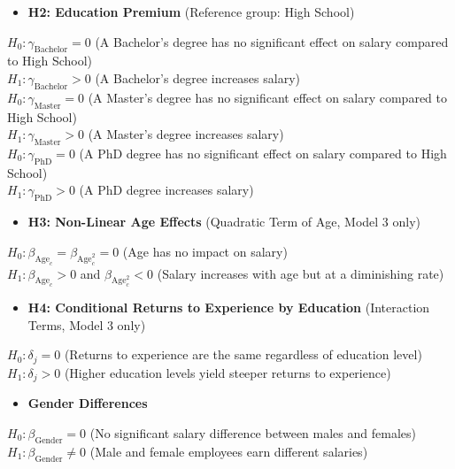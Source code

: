 \documentclass[12pt, a4paper]{article}
\begin{document}
\begin{itemize}[leftmargin=1.5em]
  \item \textbf{H2: Education Premium} (Reference group: High School)
\end{itemize}
$H_0: \gamma_{\text{Bachelor}} = 0$ (A Bachelor's degree has no significant effect on salary compared to High School)\\
$H_1: \gamma_{\text{Bachelor}} > 0$ (A Bachelor's degree increases salary)\\[0.5em]
$H_0: \gamma_{\text{Master}} = 0$ (A Master's degree has no significant effect on salary compared to High School)\\
$H_1: \gamma_{\text{Master}} > 0$ (A Master's degree increases salary)\\[0.5em]
$H_0: \gamma_{\text{PhD}} = 0$ (A PhD degree has no significant effect on salary compared to High School)\\
$H_1: \gamma_{\text{PhD}} > 0$ (A PhD degree increases salary)

\begin{itemize}[leftmargin=1.5em]
  \item \textbf{H3: Non-Linear Age Effects} (Quadratic Term of Age, Model 3 only)
\end{itemize}
$H_0: \beta_{\text{Age}_c} = \beta_{\text{Age}_c^2} = 0$ (Age has no impact on salary)\\
$H_1: \beta_{\text{Age}_c} > 0$ and $\beta_{\text{Age}_c^2} < 0$ (Salary increases with age but at a diminishing rate)

\begin{itemize}[leftmargin=1.5em]
  \item \textbf{H4: Conditional Returns to Experience by Education} (Interaction Terms, Model 3 only)
\end{itemize}
$H_0: \delta_j = 0$ (Returns to experience are the same regardless of education level)\\
$H_1: \delta_j > 0$ (Higher education levels yield steeper returns to experience)

\begin{itemize}[leftmargin=1.5em]
  \item \textbf{Gender Differences}
\end{itemize}
$H_0: \beta_{\text{Gender}} = 0$ (No significant salary difference between males and females)\\
$H_1: \beta_{\text{Gender}} \neq 0$ (Male and female employees earn different salaries)

\end{document}
